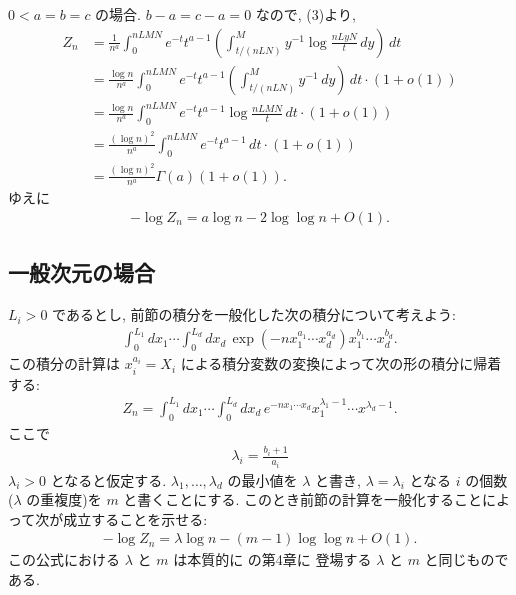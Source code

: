 \documentclass[12pt,twoside]{jarticle}
\theoremstyle{jplain}
\theoremstyle{jplain}
\theoremstyle{jplain}
\numberwithin{theorem}{section}
\numberwithin{equation}{section}
\numberwithin{figure}{section}
\numberwithin{table}{section}
\begin{document}
$0<a=b=c$ の場合. $b-a=c-a=0$ なので, (3)より, 
\begin{align*}
Z_n
&=
\frac{1}{n^a}\int_0^{nLMN} e^{-t}t^{a-1}
\left(
\int_{t/(nLN)}^M y^{-1} \log\frac{nLyN}{t}\,dy
\right)\,dt
\\ &
=
\frac{\log n}{n^a}\int_0^{nLMN} e^{-t}t^{a-1}
\left(
\int_{t/(nLN)}^M y^{-1} \,dy
\right)\,dt\cdot(1+o(1))
\\ &
=
\frac{\log n}{n^a}\int_0^{nLMN} e^{-t}t^{a-1}
\log\frac{nLMN}{t}
\,dt\cdot(1+o(1))
\\ &
=
\frac{(\log n)^2}{n^a}\int_0^{nLMN} e^{-t}t^{a-1}\,dt\cdot(1+o(1))
\\ &
=
\frac{(\log n)^2}{n^a}\Gamma(a)(1+o(1)).
\end{align*}
ゆえに
\begin{align*}
-\log Z_n = a\log n - 2\log\log n + O(1).
\end{align*}


\subsection{一般次元の場合}

$L_i>0$ であるとし, 
前節の積分を一般化した次の積分について考えよう:
\begin{align*}
\int_0^{L_1}dx_1\cdots\int_0^{L_d}dx_d\,
\exp\left(-n x_1^{a_1}\cdots x_d^{a_d}\right) x_1^{b_1}\cdots x_d^{b_d}.
\end{align*}
この積分の計算は $x_i^{a_i}=X_i$ による積分変数の変換によって次の形の積分に帰着する:
\begin{align*}
Z_n = \int_0^{L_1}dx_1\cdots\int_0^{L_d}dx_d\, e^{-nx_1\cdots x_d} 
x_1^{\lambda_1-1}\cdots x^{\lambda_d-1}.
\end{align*}
ここで
\begin{align*}
\lambda_i = \frac{b_i+1}{a_i}
\end{align*}
$\lambda_i>0$ となると仮定する.
$\lambda_1,\ldots,\lambda_d$ の最小値を $\lambda$ と書き, 
$\lambda=\lambda_i$ となる $i$ の個数($\lambda$ の重複度)を $m$ と書くことにする.
このとき前節の計算を一般化することによって次が成立することを示せる:
\begin{align*}
-\log Z_n = \lambda \log n - (m-1)\log\log n + O(1).
\end{align*}
この公式における $\lambda$ と $m$ は本質的に \cite{watanabe-2012} の第4章に
登場する $\lambda$ と $m$ と同じものである.
\end{document}
